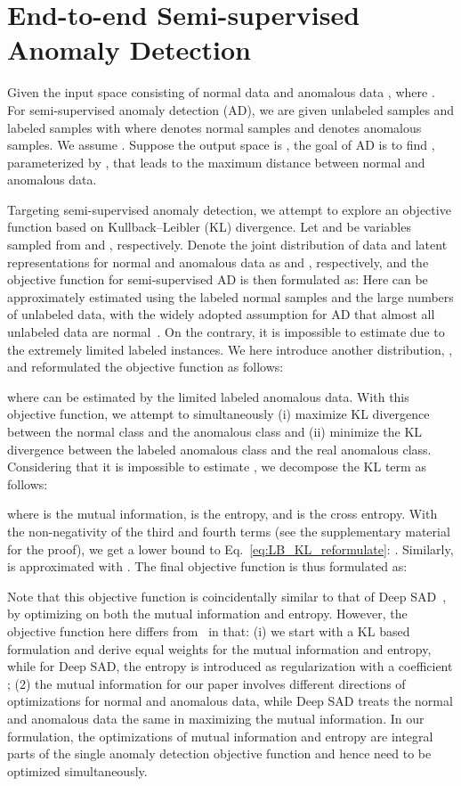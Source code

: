 \documentclass{bmvc2k}
\begin{document}
\section{End-to-end Semi-supervised Anomaly Detection}


Given the input space  consisting of normal data  and anomalous data , where . For semi-supervised anomaly detection (AD), we are given  unlabeled samples  and  labeled samples  with  where  denotes normal samples and  denotes anomalous samples. We assume . Suppose the output space is , the goal of AD is to find , parameterized by , that leads to the maximum distance between normal and anomalous data.

Targeting semi-supervised anomaly detection, we attempt to explore an objective function based on Kullback–Leibler (KL) divergence. Let  and  be variables sampled from  and , respectively.
Denote the joint distribution of data and latent representations for normal and anomalous data as  and , respectively, and the objective function for semi-supervised AD is then formulated as: 
Here  can be approximately estimated using the labeled normal samples and the large numbers of unlabeled data, with the widely adopted assumption for AD that almost all unlabeled data are normal~\cite{gornitz2013toward,ruff2018deep,Sabokrou2018Adversarially,perera2019ocgan,zhang2020p,SAD}. On the contrary, it is impossible to estimate  due to the extremely limited labeled instances. We here introduce another distribution, , and reformulated the objective function as follows:

where  can be estimated by the limited labeled anomalous data. With this objective function, we attempt to simultaneously (i) maximize KL divergence between the normal class and the anomalous class and (ii) minimize the KL divergence between the labeled anomalous class and the real anomalous class. 
Considering that it is impossible to estimate ,
we decompose the KL term  as follows:

where  is the mutual information,  is the entropy, and  is the cross entropy.
With the non-negativity of the third and fourth terms (see the supplementary material for the proof), we get a lower bound to Eq.~\eqref{eq:LB_KL_reformulate}: .
Similarly,  is approximated with .
The final objective function is thus formulated as:

Note that this objective function is coincidentally similar to that of Deep SAD~\cite{SAD}, by optimizing on both the mutual information and entropy. However, the objective function here differs from~\cite{SAD} in that: (i) we start with a KL based formulation and derive equal weights for the mutual information and entropy, while for Deep SAD, the entropy is introduced as regularization with a coefficient ; (2) the mutual information for our paper involves different directions of optimizations for normal and anomalous data, while Deep SAD treats the normal and anomalous data the same in maximizing the mutual information. In our formulation, the optimizations of mutual information and entropy are integral parts of the single anomaly detection objective function and hence need to be optimized simultaneously.
\end{document}
